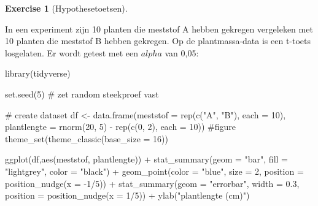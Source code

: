 \documentclass[
  letterpaper,
  DIV=11,
  numbers=noendperiod]{scrreprt}
\newenvironment{Shaded}{\begin{snugshade}}{\end{snugshade}}
\newcommand{\AttributeTok}[1]{\textcolor[rgb]{0.40,0.45,0.13}{#1}}
\newcommand{\CommentTok}[1]{\textcolor[rgb]{0.37,0.37,0.37}{#1}}
\newcommand{\DecValTok}[1]{\textcolor[rgb]{0.68,0.00,0.00}{#1}}
\newcommand{\FloatTok}[1]{\textcolor[rgb]{0.68,0.00,0.00}{#1}}
\newcommand{\FunctionTok}[1]{\textcolor[rgb]{0.28,0.35,0.67}{#1}}
\newcommand{\NormalTok}[1]{\textcolor[rgb]{0.00,0.23,0.31}{#1}}
\newcommand{\OtherTok}[1]{\textcolor[rgb]{0.00,0.23,0.31}{#1}}
\newcommand{\SpecialCharTok}[1]{\textcolor[rgb]{0.37,0.37,0.37}{#1}}
\newcommand{\StringTok}[1]{\textcolor[rgb]{0.13,0.47,0.30}{#1}}
\theoremstyle{definition}
\newtheorem{exercise}{Exercise}[chapter]
\theoremstyle{remark}
\begin{document}
\leavevmode{}%
\begin{exercise}[Hypothesetoetsen]\label{exr-hypothesetoetsen}

In een experiment zijn 10 planten die meststof A hebben gekregen
vergeleken met 10 planten die meststof B hebben gekregen. Op de
plantmassa-data is een t-toets losgelaten. Er wordt getest met een
\(alpha\) van 0,05:

\begin{Shaded}
\begin{Highlighting}[]
\FunctionTok{library}\NormalTok{(tidyverse)}

\FunctionTok{set.seed}\NormalTok{(}\DecValTok{5}\NormalTok{) }\CommentTok{\# zet random steekproef vast}

\CommentTok{\# create dataset}
\NormalTok{df }\OtherTok{\textless{}{-}} \FunctionTok{data.frame}\NormalTok{(}\AttributeTok{meststof =} \FunctionTok{rep}\NormalTok{(}\FunctionTok{c}\NormalTok{(}\StringTok{"A"}\NormalTok{, }\StringTok{"B"}\NormalTok{), }\AttributeTok{each =} \DecValTok{10}\NormalTok{),}
                 \AttributeTok{plantlengte =} \FunctionTok{rnorm}\NormalTok{(}\DecValTok{20}\NormalTok{, }\DecValTok{5}\NormalTok{) }\SpecialCharTok{{-}} \FunctionTok{rep}\NormalTok{(}\FunctionTok{c}\NormalTok{(}\DecValTok{0}\NormalTok{, }\DecValTok{2}\NormalTok{), }\AttributeTok{each =} \DecValTok{10}\NormalTok{))}
\CommentTok{\#figure}
\FunctionTok{theme\_set}\NormalTok{(}\FunctionTok{theme\_classic}\NormalTok{(}\AttributeTok{base\_size =} \DecValTok{16}\NormalTok{))}

\FunctionTok{ggplot}\NormalTok{(df,}\FunctionTok{aes}\NormalTok{(meststof, plantlengte)) }\SpecialCharTok{+}
  \FunctionTok{stat\_summary}\NormalTok{(}\AttributeTok{geom =} \StringTok{"bar"}\NormalTok{, }\AttributeTok{fill =} \StringTok{"lightgrey"}\NormalTok{, }\AttributeTok{color =} \StringTok{"black"}\NormalTok{) }\SpecialCharTok{+}
  \FunctionTok{geom\_point}\NormalTok{(}\AttributeTok{color =} \StringTok{"blue"}\NormalTok{, }\AttributeTok{size =} \DecValTok{2}\NormalTok{, }
             \AttributeTok{position =} \FunctionTok{position\_nudge}\NormalTok{(}\AttributeTok{x =} \SpecialCharTok{{-}}\DecValTok{1}\SpecialCharTok{/}\DecValTok{5}\NormalTok{)) }\SpecialCharTok{+}
  \FunctionTok{stat\_summary}\NormalTok{(}\AttributeTok{geom =} \StringTok{"errorbar"}\NormalTok{, }\AttributeTok{width =} \FloatTok{0.3}\NormalTok{,}
               \AttributeTok{position =} \FunctionTok{position\_nudge}\NormalTok{(}\AttributeTok{x =} \DecValTok{1}\SpecialCharTok{/}\DecValTok{5}\NormalTok{)) }\SpecialCharTok{+}
  \FunctionTok{ylab}\NormalTok{(}\StringTok{"plantlengte (cm)"}\NormalTok{)}
\end{Highlighting}
\end{Shaded}


\end{exercise}
\end{document}
